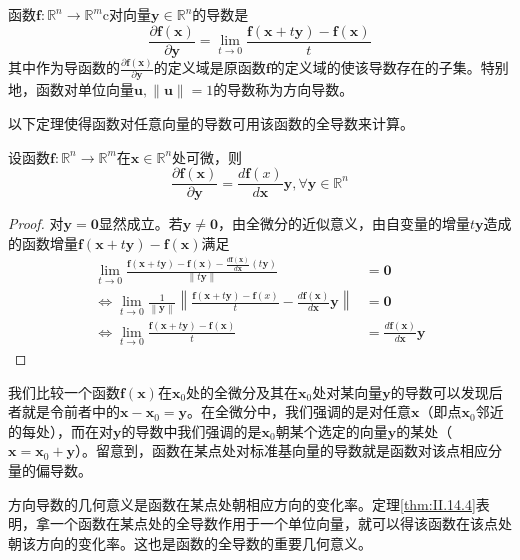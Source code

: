 \documentclass[main.tex]{subfiles}
\begin{document}
\begin{definition}
函数$\mathbf{f}:\mathbb{R}^n\rightarrow\mathbb{R}^m$c对向量$\mathbf{y}\in\mathbb{R}^n$的导数是
\[\frac{\partial\mathbf{f}\left(\mathbf{x}\right)}{\partial\mathbf{y}}=\lim_{t\to 0}\frac{\mathbf{f}\left(\mathbf{x}+t\mathbf{y}\right)-\mathbf{f}\left(\mathbf{x}\right)}{t}\]
其中作为导函数的$\frac{\partial \mathbf{f}\left(\mathbf{x}\right)}{\partial\mathbf{y}}$的定义域是原函数$\mathbf{f}$的定义域的使该导数存在的子集。特别地，函数对单位向量$\mathbf{u},\left\|\mathbf{u}\right\|=1$的导数称为方向导数。
\end{definition}

以下定理使得函数对任意向量的导数可用该函数的全导数来计算。

\begin{theorem}\label{thm:II.14.4}
设函数$\mathbf{f}:\mathbb{R}^n\rightarrow\mathbb{R}^m$在$\mathbf{x}\in\mathbb{R}^n$处可微，则
\[\frac{\partial\mathbf{f}\left(\mathbf{x}\right)}{\partial\mathbf{y}}=\frac{d\mathbf{f}\left(x\right)}{d\mathbf{x}}\mathbf{y},\forall\mathbf{y}\in\mathbb{R}^n\]
\end{theorem}
\begin{proof}
对$\mathbf{y}=\mathbf{0}$显然成立。若$\mathbf{y}\neq\mathbf{0}$，由全微分的近似意义，由自变量的增量$t\mathbf{y}$造成的函数增量$\mathbf{f}\left(\mathbf{x}+t\mathbf{y}\right)-\mathbf{f}\left(\mathbf{x}\right)$满足
\begin{align*}
\lim_{t\to 0}\frac{\mathbf{f}\left(\mathbf{x}+t\mathbf{y}\right)-\mathbf{f}\left(\mathbf{x}\right)-\frac{d\mathbf{f}\left(\mathbf{x}\right)}{d\mathbf{x}}\left(t\mathbf{y}\right)}{\left\|t\mathbf{y}\right\|}&=\mathbf{0}\\
\Leftrightarrow\lim_{t\to 0}\frac{1}{\left\|\mathbf{y}\right\|}\left\|\frac{\mathbf{f}\left(\mathbf{x}+t\mathbf{y}\right)-\mathbf{f}\left(x\right)}{t}-\frac{d\mathbf{f}\left(\mathbf{x}\right)}{d\mathbf{x}}\mathbf{y}\right\|&=\mathbf{0}\\
\Leftrightarrow\lim_{t\to 0}\frac{\mathbf{f}\left(\mathbf{x}+t\mathbf{y}\right)-\mathbf{f}\left(\mathbf{x}\right)}{t}&=\frac{d\mathbf{f}\left(\mathbf{x}\right)}{d\mathbf{x}}\mathbf{y}
\end{align*}
\end{proof}

我们比较一个函数$\mathbf{f}\left(\mathbf{x}\right)$在$\mathbf{x}_0$处的全微分及其在$\mathbf{x}_0$处对某向量$\mathbf{y}$的导数可以发现后者就是令前者中的$\mathbf{x}-\mathbf{x}_0=\mathbf{y}$。在全微分中，我们强调的是对任意$\mathbf{x}$（即点$\mathbf{x}_0$邻近的每处），而在对$\mathbf{y}$的导数中我们强调的是$\mathbf{x}_0$朝某个选定的向量$\mathbf{y}$的某处（$\mathbf{x}=\mathbf{x}_0+\mathbf{y}$）。留意到，函数在某点处对标准基向量的导数就是函数对该点相应分量的偏导数。

方向导数的几何意义是函数在某点处朝相应方向的变化率。定理\ref{thm:II.14.4}表明，拿一个函数在某点处的全导数作用于一个单位向量，就可以得该函数在该点处朝该方向的变化率。这也是函数的全导数的重要几何意义。
\end{document}
